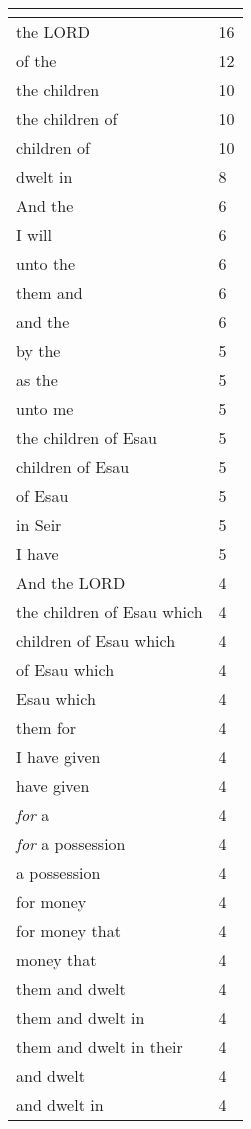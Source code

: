 \begin{center}
\begin{longtable}{|p{3.0in}|p{0.5in}|}
\hline \multicolumn{2}{c}{{ }} \\ \hline
\endfoot 
the LORD & 16\\ \hline 
of the & 12\\ \hline 
the children & 10\\ \hline 
the children of & 10\\ \hline 
children of & 10\\ \hline 
dwelt in & 8\\ \hline 
And the & 6\\ \hline 
I will & 6\\ \hline 
unto the & 6\\ \hline 
them and & 6\\ \hline 
and the & 6\\ \hline 
by the & 5\\ \hline 
as the & 5\\ \hline 
unto me & 5\\ \hline 
the children of Esau & 5\\ \hline 
children of Esau & 5\\ \hline 
of Esau & 5\\ \hline 
in Seir & 5\\ \hline 
I have & 5\\ \hline 
And the LORD & 4\\ \hline 
the children of Esau which & 4\\ \hline 
children of Esau which & 4\\ \hline 
of Esau which & 4\\ \hline 
Esau which & 4\\ \hline 
them for & 4\\ \hline 
I have given & 4\\ \hline 
have given & 4\\ \hline 
\emph{for} a & 4\\ \hline 
\emph{for} a possession & 4\\ \hline 
a possession & 4\\ \hline 
for money & 4\\ \hline 
for money that & 4\\ \hline 
money that & 4\\ \hline 
them and dwelt & 4\\ \hline 
them and dwelt in & 4\\ \hline 
them and dwelt in their & 4\\ \hline 
and dwelt & 4\\ \hline 
and dwelt in & 4\\ \hline 

\end{longtable}
\end{center}
